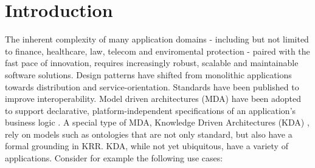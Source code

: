 \documentclass[runningheads]{llncs}
\begin{document}
\section{Introduction}
The inherent complexity of many application domains \-- including but not limited to finance, healthcare, law, telecom and enviromental protection \-- paired with the fast pace of innovation, requires increasingly robust, scalable and maintainable software solutions. Design patterns have shifted from monolithic applications towards distribution and service-orientation. Standards have been published to improve interoperability. Model driven architectures (MDA) have been adopted to support declarative, platform-independent specifications of an application's business logic \cite{Mellor:2004:MD:983969}. A special type of MDA, Knowledge Driven Architectures (KDA) \cite{Rector:2010}, rely on models such as ontologies that are not only standard, but also have a formal grounding in KRR. 
KDA, while not yet ubiquitous, have a variety of applications. Consider for example the following use cases:
\end{document}
